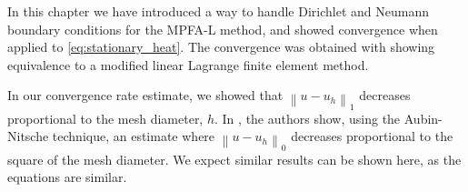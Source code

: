 \documentclass[../Main/main.tex]{subfiles}
\begin{document}
	In this chapter we have introduced a way to handle Dirichlet and Neumann boundary conditions for the MPFA-L method, and showed convergence when applied to \eqref{eq:stationary_heat}. The convergence was obtained with showing equivalence to a modified linear Lagrange finite element method.
	\begin{remark}\label{rem:l2_remark}
		In our convergence rate estimate, we showed that $\left \|u-u_h\right \|_1$ decreases proportional to the mesh diameter, $h$. In \cite{https://doi.org/10.1002/num.20525}, the authors show, using the Aubin-Nitsche technique, an estimate where $\left \|u-u_h\right \|_0$ decreases proportional to the square of the mesh diameter. We expect similar results can be shown here, as the equations are similar.
	\end{remark}
\end{document}
